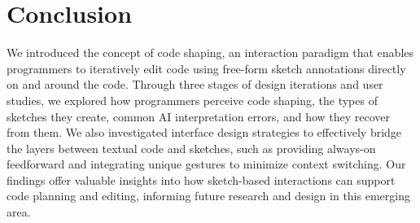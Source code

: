 \section{Conclusion}
We introduced the concept of code shaping, an interaction paradigm that enables programmers to iteratively edit code using free-form sketch annotations directly on and around the code. Through three stages of design iterations and user studies, we explored how programmers perceive code shaping, the types of sketches they create, common AI interpretation errors, and how they recover from them. We also investigated interface design strategies to effectively bridge the layers between textual code and sketches, such as providing always-on feedforward and integrating unique gestures to minimize context switching. Our findings offer valuable insights into how sketch-based interactions can support code planning and editing, informing future research and design in this emerging area.